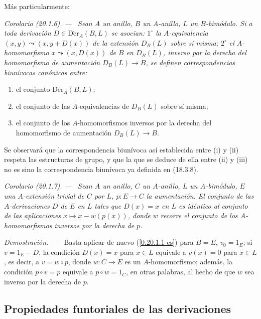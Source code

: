 \documentclass[10pt,oneside]{book}
\makeatletter
\newcommand{\sref}[1]{\textup{(\ref{#1})}}
\newcommand{\setmanualcurrentlabel}[1]{\def\@currentlabel{#1}}
\newenvironment{corollary}[1][]{%
  \setmanualcurrentlabel{#1}\par\medskip\noindent\itshape Corolario (#1). ---\ }{\par}
\newenvironment{proof}{%
  \par\medskip\noindent\textit{Demostración. ---\ }}{\par}
\providecommand{\setmin}{-}%
\makeatother
\begin{document}
Más particularmente:

\begin{corollary}[20.1.6]
\label{0.20.1.6-es}
Sean $A$ un anillo, $B$ un $A$-anillo, $L$ un $B$-bimódulo. Si a toda
derivación $D\in\operatorname{D\acute{e}r}_A(B,L)$ se asocian: $1^\circ$ la
$A$-equivalencia $(x,y)\leadsto(x,y+D(x))$ de la extensión $D_B(L)$ sobre
sí misma; $2^\circ$ el $A$-homomorfismo $x\leadsto(x,D(x))$ de $B$ en
$D_B(L)$, inverso por la derecha del homomorfismo de aumentación $D_B(L)\to B$,
se definen correspondencias biunívocas canónicas entre:
\begin{enumerate}
  \item[\rm(i)] el conjunto $\operatorname{D\acute{e}r}_A(B,L)$;
  \item[\rm(ii)] el conjunto de las $A$-equivalencias de $D_B(L)$ sobre sí misma;
  \item[\rm(iii)] el conjunto de los $A$-homomorfismos inversos por la derecha del
  homomorfismo de aumentación $D_B(L)\to B$.
\end{enumerate}
\end{corollary}

Se observará que la correspondencia biunívoca así establecida entre (i) y (ii)
respeta las estructuras de grupo, y que la que se deduce de ella entre (ii) y
(iii) no es sino la correspondencia biunívoca ya definida en (18.3.8).

\begin{corollary}[20.1.7]
\label{0.20.1.7-es}
Sean $A$ un anillo, $C$ un $A$-anillo, $L$ un $A$-bimódulo, $E$ una
$A$-extensión trivial de $C$ por $L$, $p:E\to C$ la aumentación. El conjunto
de las $A$-derivaciones $D$ de $E$ en $L$ tales que $D(x)=x$ en $L$ es
idéntico al conjunto de las aplicaciones $x\mapsto x\setmin w(p(x))$, donde $w$
recorre el conjunto de los $A$-homomorfismos inversos por la derecha de $p$.
\end{corollary}

\begin{proof}
Basta aplicar de nuevo \sref{0.20.1.1-es} para $B=E$,
$v_0=1_E$; si $v=1_E\setmin D$, la condición $D(x)=x$ para
$x\in L$ equivale a $v(x)=0$ para $x\in L$, es decir, a $v=w\circ p$,
donde $w:C\to E$ es un $A$-homomorfismo; además, la condición
$p\circ v=p$ equivale a $p\circ w=1_C$, en otras palabras, al hecho de
que $w$ sea inverso por la derecha de $p$.
\end{proof}

\subsection{Propiedades funtoriales de las derivaciones}
\label{subsection:0.20.2-es}
\end{document}
